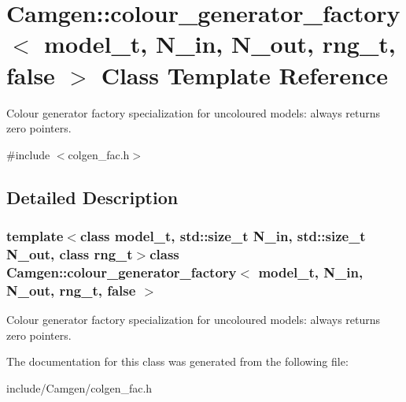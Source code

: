 \hypertarget{a00081}{}\section{Camgen\+:\+:colour\+\_\+generator\+\_\+factory$<$ model\+\_\+t, N\+\_\+in, N\+\_\+out, rng\+\_\+t, false $>$ Class Template Reference}
\label{a00081}


Colour generator factory specialization for uncoloured models\+: always returns zero pointers.  




{\ttfamily \#include $<$colgen\+\_\+fac.\+h$>$}



\subsection{Detailed Description}
\subsubsection*{template$<$class model\+\_\+t, std\+::size\+\_\+t N\+\_\+in, std\+::size\+\_\+t N\+\_\+out, class rng\+\_\+t$>$class Camgen\+::colour\+\_\+generator\+\_\+factory$<$ model\+\_\+t, N\+\_\+in, N\+\_\+out, rng\+\_\+t, false $>$}

Colour generator factory specialization for uncoloured models\+: always returns zero pointers. 



The documentation for this class was generated from the following file\+:\begin{DoxyCompactItemize}
\item 
include/\+Camgen/colgen\+\_\+fac.\+h\end{DoxyCompactItemize}
